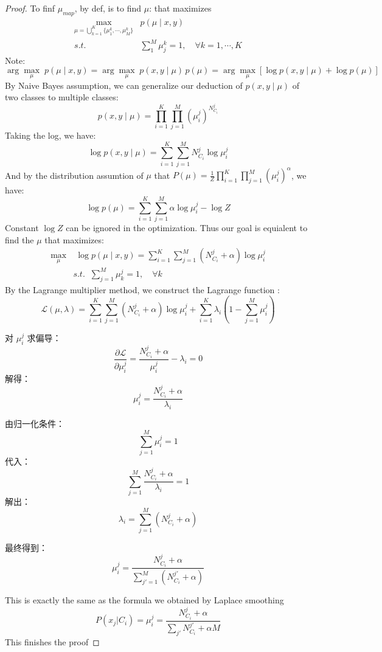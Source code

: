 \documentclass[lang=cn,11pt]{elegantbook}
\begin{document}
\begin{proof}
    To finf $\mu_{map}$, by def, is to find $\mu$: that maximizes  \begin{align}
       \max _{\mu = \bigcup_{k=1}^K      \{\mu_1^k, \cdots, \mu_M^k\} }  &p(\mu \mid x,y) \\
       s.t.  \;\;  &\sum_1^M \mu_j^k = 1,  \quad \forall k=1,\cdots, K
    \end{align}
    Note: $$\arg\max _{\mu} \;  p(\mu \mid x,y) = \arg\max_{\mu}  \; p(x,y \mid \mu) \, p(\mu) = \arg \max_\mu [\log p(x,y \mid \mu )  + \log p(\mu)]$$
By Naive Bayes assumption, we can generalize our deduction of $p(x,y \mid \mu)$ of two classes to multiple classes:
\[
   p(x, y \mid \mu) = \prod_{i=1}^{K} \prod_{j=1}^{M} (\mu_i^j)^{N_{C_i}^j}
   \] Taking the log, we have: \[
   \log p(x, y \mid \mu) = \sum_{i=1}^{K} \sum_{j=1}^{M} N_{C_i}^j \log \mu_i^j
   \]
And by the distribution assumtion of $\mu$ that $P(\mu) = \frac{1}{Z} \prod_{i=1}^{K} \prod_{j=1}^{M} (\mu_i^j)^\alpha$, we have: \[
   \log p(\mu) = \sum_{i=1}^{K} \sum_{j=1}^{M} \alpha \log \mu_i^j  -\log Z
   \]
Constant $\log Z$ can be ignored in the optimization. Thus our goal is equialent to find the $\mu$ that maximizes: \begin{align}
     \max_{\mu}  & \;\log p(\mu \mid x, y) = \sum_{i=1}^{K} \sum_{j=1}^{M} (N_{C_i}^j + \alpha) \log \mu_i^j \\
     & s.t. \;\;    \sum_{j=1}^{M} \mu_k^j = 1, \quad \forall k
\end{align}
By the Lagrange multiplier method, we construct the Lagrange function : \[
   \mathcal{L}(\mu, \lambda) = \sum_{i=1}^{K} \sum_{j=1}^{M} (N_{C_i}^j + \alpha) \log \mu_i^j + \sum_{i=1}^{K} \lambda_i \left( 1 - \sum_{j=1}^{M} \mu_i^j \right)
  \]

   对 \(\mu_i^j\) 求偏导：
   \[
   \frac{\partial \mathcal{L}}{\partial \mu_i^j} = \frac{N_{C_i}^j + \alpha}{\mu_i^j} - \lambda_i = 0
   \]
   解得：
   \[
   \mu_i^j = \frac{N_{C_i}^j + \alpha}{\lambda_i}
   \]

   由归一化条件：
   \[
   \sum_{j=1}^{M} \mu_i^j = 1
   \]
   代入：
   \[
   \sum_{j=1}^{M} \frac{N_{C_i}^j + \alpha}{\lambda_i} = 1
   \]
   解出：
   \[
   \lambda_i = \sum_{j=1}^{M} (N_{C_i}^j + \alpha)
   \]

   最终得到：
   \[
   \mu_i^j = \frac{N_{C_i}^j + \alpha}{\sum_{j'=1}^{M} (N_{C_i}^{j'} + \alpha)}
   \]

This is exactly the same as the formula we obtained by Laplace smoothing   \[
   P(x_j | C_i) = \mu_i^j= \frac{N_{C_i}^j + \alpha}{\sum_{j'} N_{C_i}^{j'} + \alpha M}
   \]
This finishes the proof
    
\end{proof}
\end{document}
